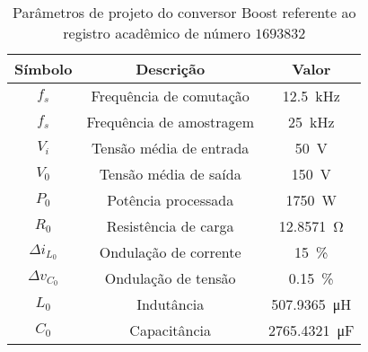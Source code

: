 \begin{table}[!ht]
\centering
\caption{Parâmetros de projeto do conversor Boost referente ao registro acadêmico de número $1693832$}
\label{tab:parametros}
\begin{tabular}{@{}ccc@{}}
\toprule
\textbf{Símbolo} & \textbf{Descrição} & \textbf{Valor}\\ \midrule
$f_s$ & Frequência de comutação & \SI{12.5}{\kilo\hertz}\\
$f_s$ & Frequência de amostragem & \SI{25}{\kilo\hertz}\\
$V_i$ & Tensão média de entrada  & \SI{50}{\V}\\
$V_0$ & Tensão média de saída  & \SI{150}{\V} \\
$P_0$ & Potência processada  & \SI{1750}{\W} \\
$R_0$ & Resistência de carga & \SI{12.8571}{\ohm} \\
$\Delta{i_{L_0}}$  & Ondulação de corrente & \SI{15}{\%}\\
$\Delta{v_{C_0}}$  & Ondulação de tensão & \SI{0.15}{\%}\\
$L_0$ & Indutância & \SI{507.9365}{\micro\henry}\\
$C_0$ & Capacitância & \SI{2765.4321}{\micro\farad}\\
\bottomrule
\end{tabular}
\end{table}

